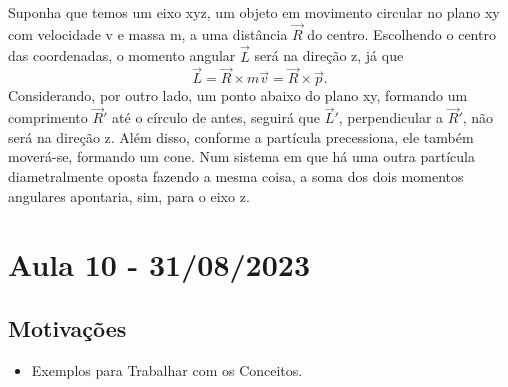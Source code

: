 \documentclass{article}
\begin{document}
  Suponha que temos um eixo xyz, um objeto em movimento circular no plano xy com velocidade v e massa m, a uma distância \(\vec{R}\) do centro.
Escolhendo o centro das coordenadas, o momento angular \(\vec{L}\) será na direção z, já que 
  \[
    \vec{L} = \vec{R}\times m \vec{v} = \vec{R}\times \vec{p}.
  \]
  Considerando, por outro lado, um ponto abaixo do plano xy, formando um comprimento \(\vec{R}'\) até o círculo de antes, seguirá que \(\vec{L}'\), perpendicular a 
 \(\vec{R}'\), não será na direção z. Além disso, conforme a partícula precessiona, ele também moverá-se, formando um cone. Num sistema em que há uma outra partícula diametralmente
 oposta fazendo a mesma coisa, a soma dos dois momentos angulares apontaria, sim, para o eixo z.
\newpage

\section{Aula 10 - 31/08/2023}
\subsection{Motivações}
\begin{itemize}
  \item Exemplos para Trabalhar com os Conceitos.
\end{itemize}
\end{document}
